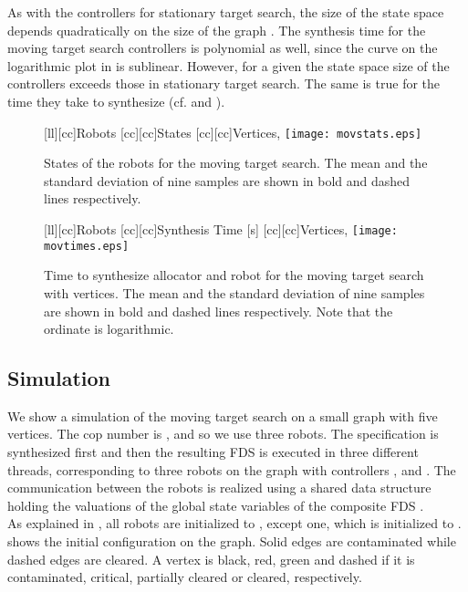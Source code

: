 As with the controllers for stationary target search, the size of the state space depends quadratically on the size of the graph . The synthesis time for the moving target search controllers is polynomial as well, since the curve on the logarithmic plot in  is sublinear. However, for a given  the state space size of the controllers exceeds those in stationary target search. The same is true for the time they take to synthesize (cf.  and ). \\

\begin{figure}
\centering
	[ll][cc]{\footnotesize{Robots }}
	[cc][cc]{\footnotesize{States}}
	[cc][cc]{\footnotesize{Vertices, }}
	\texttt{[image: movstats.eps]}
\caption{States of the robots for the moving target search. The mean and the standard deviation of nine samples are shown in bold and dashed lines respectively.}
\label{fig:movstates}
\end{figure}

\begin{figure}
\centering
	[ll][cc]{\footnotesize{Robots }}
	[cc][cc]{\footnotesize{Synthesis Time [s]}}
	[cc][cc]{\footnotesize{Vertices, }}
	\texttt{[image: movtimes.eps]}
\caption{Time to synthesize allocator and robot for the moving target search with  vertices. The mean and the standard deviation of nine samples are shown in bold and dashed lines respectively. Note that the ordinate is logarithmic.}
\label{fig:movtimes}
\end{figure}


\subsection{Simulation}

We show a simulation of the moving target search on a small graph  with five vertices. The cop number is , and so we use three robots. The specification is synthesized first and then the resulting FDS is executed in three different threads, corresponding to three robots on the graph  with controllers ,  and . The communication between the robots is realized using a shared data structure holding the valuations of the global state variables  of the composite FDS .\\

As explained in , all robots are initialized to , except one, which is initialized to .  shows the initial configuration on the graph. Solid edges are contaminated while dashed edges are cleared. A vertex is black, red, green and dashed if it is contaminated, critical, partially cleared or cleared, respectively.\\

